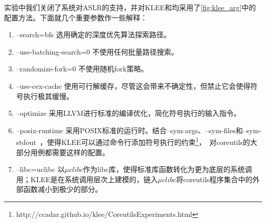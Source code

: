 实验中我们关闭了系统对ASLR的支持，并对KLEE和\dryrun 均采用了\autoref{fig:klee_arg}中的配置方法。下面就几个重要参数作一些解释：
\begin{enumerate}[label={(\arabic*)}]
\item \textmd{--search=bfs} 选用确定的深度优先算法探索路径。
\item \textmd{--use-batching-search=0} 不使用任何批量路径搜索。
\item \textmd{--randomize-fork=0} 不使用随机fork策略。
\item \textmd{--use-cex-cache} 使用可行解缓存，尽管这会带来不确定性，但禁止它会使得符号执行极其缓慢。
\item \textmd{--optimize} 采用LLVM进行标准的编译优化，简化符号执行的输入指令。
\item \textmd{--posix-runtime} 采用POSIX标准的运行时。结合\textmd{--sym-args}、\textmd{--sym-files}和\textmd{--sym-stdout}~，使得KLEE可以通过命令行添加符号执行的约束\footnote{http://ccadar.github.io/klee/CoreutilsExperiments.html}，~\cite{KLEE}对coreutils的大部分用例都需要这样的配置。
\item \textmd{--libc=uclibc} 以$\mu clibc$作为libc库，使得标准库函数转化为更为底层的系统调用；KLEE是在系统调用层次上建模的，链入$\mu clibc$将coreutils程序集合中的外部函数减小到极少的部分。
\end{enumerate}
